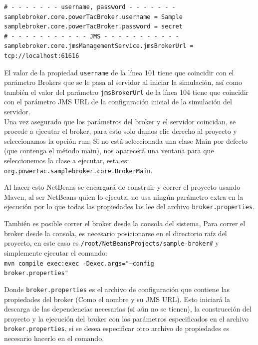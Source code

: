 
\begin{lstlisting}[frame=single]  
# - - - - - - - username, password - - - - - - -
samplebroker.core.powerTacBroker.username = Sample
samplebroker.core.powerTacBroker.password = secret
# - - - - - - - - - - - JMS - - - - - - - - - - -
samplebroker.core.jmsManagementService.jmsBrokerUrl =
tcp://localhost:61616
\end{lstlisting}

El valor de la propiedad \texttt{username} de la línea 101 
tiene que coincidir con el parámetro Brokers que se le pasa al servidor al iniciar la simulación, así como también el valor del parámetro \texttt{jmsBrokerUrl} de la línea 104 tiene que coincidir con el parámetro JMS URL de la configuración inicial de la simulación del servidor.\\

Una vez asegurado que los parámetros del broker y el servidor coincidan, se procede a ejecutar el broker, para esto solo damos clic derecho al proyecto y seleccionamos la opción run; 
Si no está seleccionada una clase Main por defecto (que contenga el método main), nos aparecerá una ventana para que seleccionemos la clase a ejecutar, esta es:\\ \texttt{org.powertac.samplebroker.core.BrokerMain}.

Al hacer esto NetBeans se encargará de construir y correr el proyecto usando Maven, al ser NetBeans quien lo ejecuta, no usa ningún parámetro extra en la ejecución por lo que todas las propiedades las lee del archivo \texttt{broker.properties}.

También es posible correr el broker desde la consola del sistema, Para correr el broker desde la consola, es necesario posicionarse en el directorio raíz del proyecto, en este caso es \texttt{/root/NetBeansProjects/sample-broker\#} y simplemente ejecutar el comando:\\
\texttt{mvn compile exec:exec -Dexec.args="--config \\
broker.properties"\\
}

Donde \texttt{broker.properties} es el archivo de configuración que contiene las propiedades del broker (Como el nombre y su JMS URL).
Esto iniciará la descarga de las dependencias necesarias (si aún no se tienen), la construcción del proyecto y la ejecución del broker con los parámetros especificados en el archivo \texttt{broker.properties}, si se desea especificar otro archivo de propiedades es necesario hacerlo en el comando.

